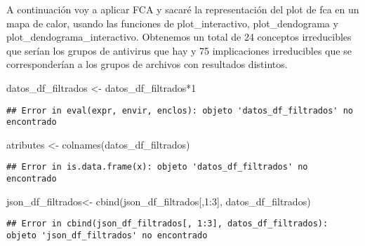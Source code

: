 \documentclass[
]{book}
\newenvironment{Shaded}{\begin{snugshade}}{\end{snugshade}}
\newcommand{\DecValTok}[1]{\textcolor[rgb]{0.00,0.00,0.81}{#1}}
\newcommand{\FunctionTok}[1]{\textcolor[rgb]{0.00,0.00,0.00}{#1}}
\newcommand{\NormalTok}[1]{#1}
\newcommand{\OtherTok}[1]{\textcolor[rgb]{0.56,0.35,0.01}{#1}}
\newcommand{\SpecialCharTok}[1]{\textcolor[rgb]{0.00,0.00,0.00}{#1}}
\begin{document}
A continuación voy a aplicar FCA y sacaré la representación del plot de fca en un mapa de calor, usando las funciones de plot\_interactivo, plot\_dendograma y plot\_dendograma\_interactivo. Obtenemos un total de 24 conceptos irreducibles que serían los grupos de antivirus que hay y 75 implicaciones irreducibles que se corresponderían a los grupos de archivos con resultados distintos.

\begin{Shaded}
\begin{Highlighting}[]
\NormalTok{datos\_df\_filtrados }\OtherTok{\textless{}{-}}\NormalTok{ datos\_df\_filtrados}\SpecialCharTok{*}\DecValTok{1}
\end{Highlighting}
\end{Shaded}

\begin{verbatim}
## Error in eval(expr, envir, enclos): objeto 'datos_df_filtrados' no encontrado
\end{verbatim}

\begin{Shaded}
\begin{Highlighting}[]
\NormalTok{atributes }\OtherTok{\textless{}{-}} \FunctionTok{colnames}\NormalTok{(datos\_df\_filtrados)}
\end{Highlighting}
\end{Shaded}

\begin{verbatim}
## Error in is.data.frame(x): objeto 'datos_df_filtrados' no encontrado
\end{verbatim}

\begin{Shaded}
\begin{Highlighting}[]
\NormalTok{json\_df\_filtrados}\OtherTok{\textless{}{-}} \FunctionTok{cbind}\NormalTok{(json\_df\_filtrados[,}\DecValTok{1}\SpecialCharTok{:}\DecValTok{3}\NormalTok{], datos\_df\_filtrados)}
\end{Highlighting}
\end{Shaded}

\begin{verbatim}
## Error in cbind(json_df_filtrados[, 1:3], datos_df_filtrados): objeto 'json_df_filtrados' no encontrado
\end{verbatim}

\begin{Shaded}
\end{Shaded}
\end{document}
